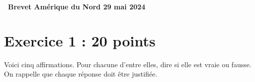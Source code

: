 \documentclass[11pt]{article}
\begin{document}


\hypertarget{AmeriqueduNord}{}
\label{AmeriqueduNord}

\pagestyle{fancy}
\thispagestyle{empty}
\begin{center} {\huge \textbf{\decofourleft~Brevet Amérique du Nord 29 mai 2024 \decofourright}}
\end{center}

\bigskip

\section*{Exercice 1 : \hfill 20 points}
Voici cinq affirmations. Pour chacune d'entre elles, dire si elle est vraie ou fausse. On rappelle que chaque réponse doit être justifiée.
\end{document}
